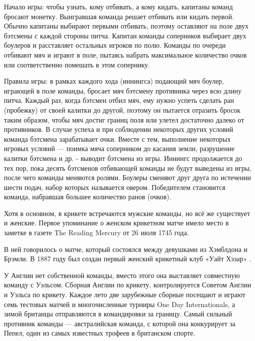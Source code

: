 Начало игры: чтобы узнать, кому отбивать, а кому кидать, капитаны команд бросают монетку. Выигравшая команда решает отбивать или кидать первой. Обычно капитаны выбирают первыми отбивать, поэтому оставляют на поле двух бэтсмены с каждой стороны питча. Капитан команды соперников выбирает двух боулеров и расставляет остальных игроков по полю. Команды по очереди отбивают мяч и играют в поле, пытаясь набрать максимальное количество очков или соответственно помешать в этом сопернику.

Правила игры: в рамках каждого хода (иннингса) подающий мяч боулер, играющей в поле команды, бросает мяч бэтсмену противника через всю длину питча. Каждый раз, когда бэтсмен отбил мяч, ему нужно успеть сделать ран (пробежку) от своей калитки до другой, поэтому он пытается отразить бросок таким образом, чтобы мяч достиг границ поля или улетел достаточно далеко от противников. В случае успеха и при соблюдении некоторых других условий команда бэтсмена зарабатывает очки. Вместе с тем, выполнение некоторых игровых условий --- поимка мяча соперником до касания земли, разрушение калитки бэтсмена и др. - выводит бэтсмена из игры. Иннингс продолжается до тех пор, пока десять бэтсменов отбивающей команды не будут выведены из игры, после чего команды меняются ролями. Боулеры сменяют друг друга по истечении шести подач, набор которых называется овером. Победителем становится команда, набравшая большее количество ранов (очков).

Хотя в основном, в крикете встречаются мужские команды, но всё же существует и женские. Первое упоминание о женском крикетном матче имело место в заметке в газете The Reading Mercury от 26 июля 1745 года.

В ней говорилось о матче, который состоялся между девушками из Хэмблдона и Брэмли. В 1887 году был создан первый женский крикетный клуб «Уайт Хэзар» \cite{cricet}.

У Англии нет собственной команды, вместо этого она выставляет совместную команду с Уэльсом. Сборная Англии по крикету, контролируется Советом Англии и Уэльса по крикету. Каждое лето две зарубежные сборные посещают и играют семь тестовых матчей и многочисленные турниры One Day Internationals, а зимой британцы отправляются в командировки за границу. Самый сильный противник команды --- австралийская команда, с которой она конкурирует за Пепел, один из самых известных трофеев в британском спорте.

